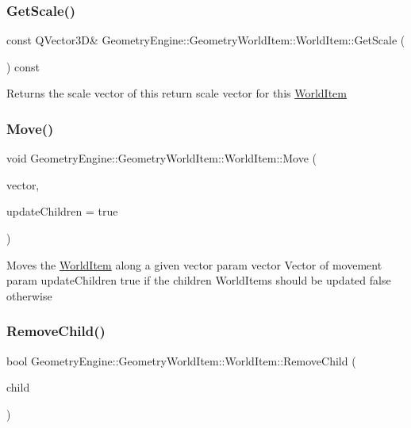 \subsubsection{\texorpdfstring{GetScale()}{GetScale()}}
{\footnotesize\ttfamily const Q\+Vector3D\& Geometry\+Engine\+::\+Geometry\+World\+Item\+::\+World\+Item\+::\+Get\+Scale (\begin{DoxyParamCaption}{ }\end{DoxyParamCaption}) const\hspace{0.3cm}{\ttfamily [inline]}}

Returns the scale vector of this return scale vector for this \mbox{\hyperlink{class_geometry_engine_1_1_geometry_world_item_1_1_world_item}{World\+Item}} \mbox{\label{class_geometry_engine_1_1_geometry_world_item_1_1_world_item_ae7921493ddc77cf794358ae41754a3e0}} 
\subsubsection{\texorpdfstring{Move()}{Move()}}
{\footnotesize\ttfamily void Geometry\+Engine\+::\+Geometry\+World\+Item\+::\+World\+Item\+::\+Move (\begin{DoxyParamCaption}\item[{const Q\+Vector3D \&}]{vector,  }\item[{bool}]{update\+Children = {\ttfamily true} }\end{DoxyParamCaption})}

Moves the \mbox{\hyperlink{class_geometry_engine_1_1_geometry_world_item_1_1_world_item}{World\+Item}} along a given vector param vector Vector of movement param update\+Children true if the children World\+Items should be updated false otherwise \mbox{\label{class_geometry_engine_1_1_geometry_world_item_1_1_world_item_a7d73575daa22395164123b26d514f42a}} 
\subsubsection{\texorpdfstring{RemoveChild()}{RemoveChild()}}
{\footnotesize\ttfamily bool Geometry\+Engine\+::\+Geometry\+World\+Item\+::\+World\+Item\+::\+Remove\+Child (\begin{DoxyParamCaption}\item[{\mbox{\hyperlink{class_geometry_engine_1_1_geometry_world_item_1_1_world_item}{World\+Item}} $\ast$}]{child }\end{DoxyParamCaption})}

